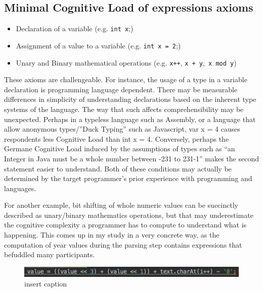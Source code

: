 \subsection{Minimal Cognitive Load of expressions axioms}
\begin{itemize}
	\item Declaration of a variable (e.g.  \texttt{int x};)
 	\item Assignment of a value to a variable (e.g.  \texttt{int x =  2};)
	\item Unary and Binary mathematical operations (e.g. \texttt{x++}, \texttt{x + y},\texttt{ x mod y})
\end{itemize}
These axioms are challengeable. For instance, the usage of a type in a variable declaration is programming language dependent. There may be measurable differences in simplicity of understanding declarations based on the inherent type systems of the language. The way that such affects comprehensibility may be unexpected. Perhaps in a typeless language such as Assembly, or a language that allow anonymous types/”Duck Typing” such as Javascript, var x = 4 causes respondents less Cognitive Load than int x = 4. Conversely, perhaps the Germane Cognitive Load induced by the assumptions of types such as “an Integer in Java must be a whole number between -231 to 231-1” makes the second statement easier to understand. Both of these conditions may actually be determined by the target programmer’s prior experience with programming and languages.

For another example, bit shifting of whole numeric values can be succinctly described as unary/binary mathematics operations, but that may underestimate the cognitive complexity a programmer has to compute to understand what is happening. This comes up in my study in a very concrete way, as the computation of year values during the parsing step contains expressions that befuddled many participants.

\begin{figure}[H]
	\centering
	\includegraphics[width=\linewidth]{code}
	\caption{insert caption}
\end{figure}

